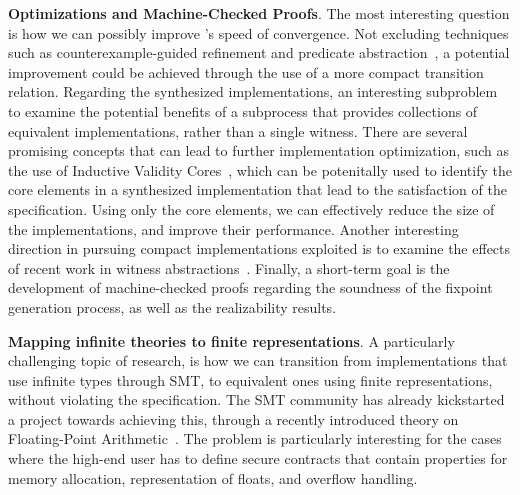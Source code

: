 \textbf{Optimizations and Machine-Checked Proofs}. The most interesting question is how we can possibly improve \jsynvg's
speed of convergence. Not excluding techniques such as counterexample-guided
refinement and predicate abstraction~\cite{walker2014predicate}, a potential
improvement could be achieved through the use of a more compact transition
relation. Regarding the synthesized implementations, an interesting subproblem to examine the potential benefits of a subprocess that provides collections of equivalent implementations, rather than
a single witness. There are several promising concepts that can lead to further implementation optimization, such as the use of Inductive Validity Cores~\cite{Ghass16}, which can be potenitally used to identify the core elements in a synthesized implementation that lead to the satisfaction of the specification. Using only the core elements, we can effectively reduce the size of the implementations, and improve their performance. Another interesting direction in pursuing compact implementations exploited is to examine the effects of recent work in witness abstractions~\cite{jakobs2017compact}. Finally, a short-term goal is the development of machine-checked
proofs regarding the soundness of the fixpoint generation process, as well as the realizability results.

\iffalse
\textbf{Test case generation}. \aeval's effectiveness in providing witnesses to the
satisfiability of $\forall\exists$-formulas can be also exploited in terms of the
tool providing concrete counterexamples to a subset of unrealizable contracts that relate to formula $\phi' \gets \forall s. \ (F(s) \Rightarrow \exists i. A(s,i) \land \lnot Q(s,i))'$ being valid (Algorithm~\ref{alg:synthesis}, Line 16).
In this particular case, if $\phi'$ is a valid formula, it is possible a witness that can be essentially used as a test case to demonstrate the specification's unrealizability. The witness contains
certain assignments to input variables, for which the condition of viability does not hold, for any state. In conjunction with the potential capabilities of generating collections of equivalent implementations, this problem may lead to the creation of an elegant process that constructs test suites against the contract's realizability. Such a test suite can then be used as a complementary collection to testing procedures that take place towards the end of the system's development.
\fi
\textbf{Mapping infinite theories to finite representations}. A particularly challenging topic of research, is how we can transition from implementations that use
infinite types through SMT, to equivalent ones using finite representations, without violating the specification. The SMT community has already kickstarted a project towards achieving this, through a recently introduced theory on Floating-Point Arithmetic~\cite{brain2015automatable}. The problem is particularly interesting for the cases where the high-end user has to define secure contracts that contain properties for memory allocation, representation of floats, and overflow handling.
\fi 